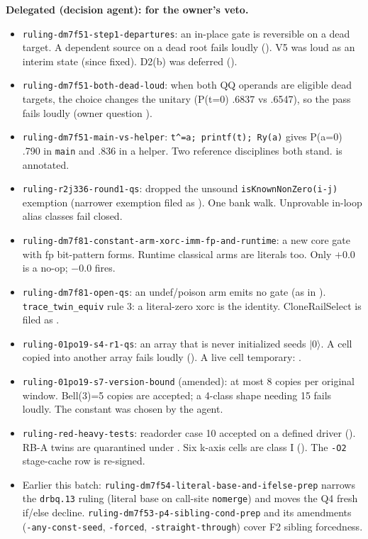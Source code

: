 \textbf{Delegated (decision agent): for the owner's veto.}
\begin{itemize}[itemsep=1pt]
\item \texttt{ruling-dm7f51-step1-departures}: an in-place gate is reversible on a dead target. A dependent source on a dead root fails loudly (). V5 was loud as an interim state (since fixed). D2(b) was deferred ().
\item \texttt{ruling-dm7f51-both-dead-loud}: when both QQ operands are eligible dead targets, the choice changes the unitary (P(t=0) .6837 vs .6547), so the pass fails loudly (owner question ).
\item \texttt{ruling-dm7f51-main-vs-helper}: \texttt{t\textasciicircum=a; printf(t); Ry(a)} gives P(a=0) .790 in \texttt{main} and .836 in a helper. Two reference disciplines both stand.  is annotated.
\item \texttt{ruling-r2j336-round1-qs}: dropped the unsound \texttt{isKnownNonZero(i-j)} exemption (narrower exemption filed as ). One bank walk. Unprovable in-loop alias classes fail closed.
\item \texttt{ruling-dm7f81-constant-arm-xorc-imm-fp-and-runtime}: a new core gate with fp bit-pattern forms. Runtime classical arms are literals too. Only $+0.0$ is a no-op; $-0.0$ fires.
\item \texttt{ruling-dm7f81-open-qs}: an undef/poison arm emits no gate (as in ). \texttt{trace\_twin\_equiv} rule 3: a literal-zero xorc is the identity. CloneRailSelect is filed as .
\item \texttt{ruling-01po19-s4-r1-qs}: an array that is never initialized seeds $|0\rangle$. A cell copied into another array fails loudly (). A live cell temporary: .
\item \texttt{ruling-01po19-s7-version-bound} (amended): at most 8 copies per original window. Bell(3)=5 copies are accepted; a 4-class shape needing 15 fails loudly. The constant was chosen by the agent.
\item \texttt{ruling-red-heavy-tests}: readorder case 10 accepted on a defined driver (). RB-A twins are quarantined under . Six k-axis cells are class I (). The \texttt{-O2} stage-cache row is re-signed.
\item Earlier this batch: \texttt{ruling-dm7f54-literal-base-and-ifelse-prep} narrows the \texttt{drbq.13} ruling (literal base on call-site \texttt{nomerge}) and moves the Q4 fresh if/else decline. \texttt{ruling-dm7f53-p4-sibling-cond-prep} and its amendments (\texttt{-any-const-seed}, \texttt{-forced}, \texttt{-straight-through}) cover F2 sibling forcedness.
\end{itemize}

